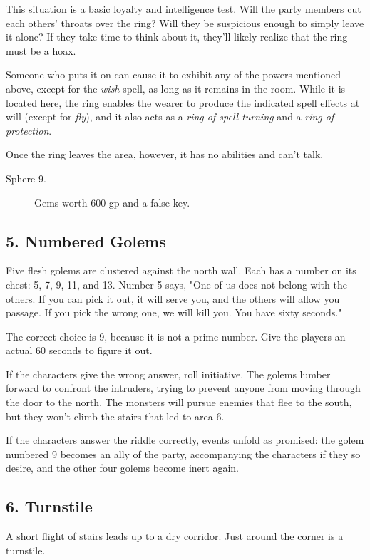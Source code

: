 \documentclass[10pt,a4paper,twoside,bg=print,twocolumn,openany,nodeprecatedcode]{dndbook}
\begin{document}
This situation is a basic loyalty and intelligence test. Will the party members cut each others' throats over the ring? Will they be suspicious enough to simply leave it alone? If they take time to think about it, they'll likely realize that the ring must be a hoax.

Someone who puts it on can cause it to exhibit any of the powers mentioned above, except for the \textit{wish} spell, as long as it remains in the room. While it is located here, the ring enables the wearer to produce the indicated spell effects at will (except for \textit{fly}), and it also acts as a \textit{ring of spell turning} and a \textit{ring of protection}.

Once the ring leaves the area, however, it has no abilities and can't talk.


\begin{description}
\item[Sphere 9.]
Gems worth 600 gp and a false key.
\end{description}

\subsection{5. Numbered Golems}
\begin{DndReadAloud}{}
Five flesh golems are clustered against the north wall. Each has a number on its chest: 5, 7, 9, 11, and 13. Number 5 says, "One of us does not belong with the others. If you can pick it out, it will serve you, and the others will allow you passage. If you pick the wrong one, we will kill you. You have sixty seconds."

\end{DndReadAloud}

The correct choice is 9, because it is not a prime number. Give the players an actual 60 seconds to figure it out.

If the characters give the wrong answer, roll initiative. The golems lumber forward to confront the intruders, trying to prevent anyone from moving through the door to the north. The monsters will pursue enemies that flee to the south, but they won't climb the stairs that led to area 6.

If the characters answer the riddle correctly, events unfold as promised: the golem numbered 9 becomes an ally of the party, accompanying the characters if they so desire, and the other four golems become inert again.

\subsection{6. Turnstile}
\begin{DndReadAloud}{}
A short flight of stairs leads up to a dry corridor. Just around the corner is a turnstile.

\end{DndReadAloud}
\end{document}
